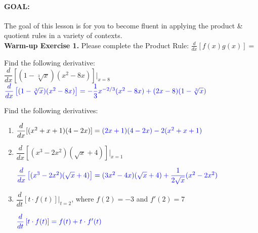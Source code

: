 \documentclass[10pt]{article}
\begin{document}
\paragraph*{GOAL:} The goal of this lesson is for you to become fluent in applying the product \& quotient rules in a variety of contexts.\\

{\bf\color{blue}Warm-up Exercise 1.} Please complete the Product Rule: $\displaystyle \frac{d}{dx}[f(x)g(x)]=$   

{} Find the following derivative:\\

$\dfrac{d}{dx}\left[(1-\sqrt[3]{x})(x^2-8x)\right]\bigg|_{x=8}$\\

${\color{blue}\dfrac{d}{dx}\left[(1-\sqrt[3]{x})(x^2-8x)\right]=-\dfrac{1}{3}x^{-2/3}(x^2-8x)+(2x-8)(1-\sqrt[3]{x})}$


\vfill

{} Find the following derivatives:\\

\begin{enumerate}
\item[(a)] $\dfrac{d}{dx}[(x^2+x+1)(4-2x)]={\color{blue}(2x+1)(4-2x)-2(x^2+x+1)}$

\vfill

\item[(b)] $\dfrac{d}{dx}[(x^3-2x^2)(\sqrt{x}+4)]\bigg|_{x=1}$

${\color{blue}\dfrac{d}{dx}\left[(x^3-2x^2)(\sqrt{x}+4)\right]=(3x^2-4x)(\sqrt{x}+4)+\dfrac{1}{2\sqrt{x}}(x^2-2x^2)}$


\vfill
\vfill

\item[(c)] $\dfrac{d}{dt}\left[ t\cdot f(t) \right]\bigg|_{t=2}$, where $f(2)=-3$ and $f'(2)=7$

${\color{blue}\dfrac{d}{dt}\left[ t\cdot f(t) \right]=f(t)+t\cdot f'(t)}$


\vfill
\vfill

\end{enumerate}
\end{document}
